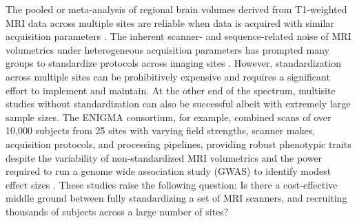 The pooled  or meta-analysis of regional brain volumes derived from T1-weighted MRI data across multiple sites are reliable when data is acquired with similar acquisition parameters \cite{cannon2014,multicenter01,freesurferReliability}. The inherent scanner- and sequence-related noise of MRI volumetrics under heterogeneous acquisition parameters has prompted many groups to standardize protocols across imaging sites \cite{cannon2014,adniharmonize,ADNIReview}. However, standardization across multiple sites can be prohibitively expensive and requires a significant effort to implement and maintain. %
At the other end of the spectrum, multisite studies without standardization can also be successful albeit with extremely large sample sizes. The ENIGMA consortium, for example, combined scans of over 10,000 subjects from 25 sites with varying field strengths, scanner makes, acquisition protocols, and processing pipelines, providing robust phenotypic traits despite the variability of non-standardized MRI volumetrics and the power required to run a genome wide association study (GWAS) to identify modest effect sizes \cite{thompson2014enigma}. These studies raise the following question: Is there a cost-effective middle ground between fully standardizing a set of MRI scanners, and recruiting thousands of subjects across a large number of sites? %